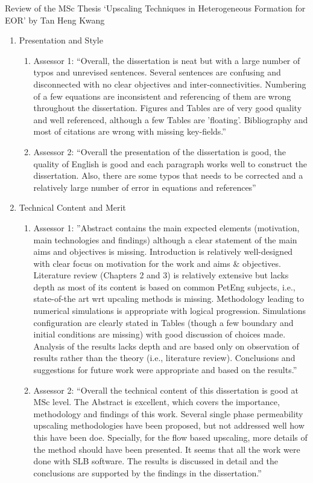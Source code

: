 \documentclass[14pt,twoside]{report}
\begin{document}
\begin{center}
  {\Large Review of the MSc Thesis `Upscaling Techniques in Heterogeneous Formation for EOR' by Tan Heng Kwang }
\end{center}
\begin{enumerate}%
\item Presentation and Style
    \begin{enumerate}%
       \item Assessor 1: ``Overall, the dissertation is neat but with a large number of typos and unrevised sentences. Several sentences are confusing and disconnected with no clear objectives and inter-connectivities. Numbering of a few equations are inconsistent and referencing of them are wrong throughout the dissertation. Figures and Tables are of very good quality and well referenced, although a few Tables are 'floating'. Bibliography and most of citations are wrong with missing key-fields.''
       \item Assessor 2: ``Overall the presentation of the dissertation is good, the quality of English is good and each paragraph works well to construct the dissertation. Also, there are some typos that needs to be corrected and a relatively large number of error in equations and references''
    \end{enumerate}
%  
   \item Technical Content and Merit
    \begin{enumerate}%
       \item Assessor 1: ''Abstract contains the main expected elements (motivation, main technologies and findings) although a clear statement of the main aims and objectives is missing. Introduction is relatively well-designed with clear focus on motivation for the work and aims $\&$ objectives. Literature review (Chapters 2 and 3) is relatively extensive but lacks depth as most of its content is based on common PetEng subjects, i.e., state-of-the art wrt upcaling methods is missing. Methodology leading to numerical simulations is appropriate with logical progression. Simulations configuration are clearly stated in Tables (though a few boundary and initial conditions are missing) with good discussion of choices made. Analysis of the results lacks depth and are based only on observation of results rather than the theory (i.e., literature review). Conclusions and suggestions for future work were appropriate and based on the results.''
       \item Assessor 2: ``Overall the technical content of this dissertation is good at MSc level. The Abstract is excellent, which covers the importance, methodology and findings of this work. Several single phase permeability upscaling methodologies have been proposed, but not addressed  well how this have been doe. Specially, for the flow based upscaling, more details of the method should have been presented. It seems that all the work were done with SLB software. The results is discussed in detail and the conclusions are supported by the findings in the dissertation.''

\end{enumerate}
\end{enumerate}
\end{document}
